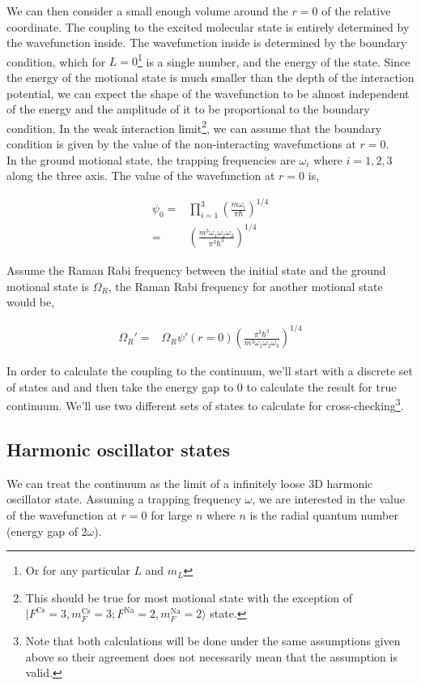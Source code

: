 \documentclass[10pt,fleqn]{article}
\newcommand{\eqar}[1]
{
  \begin{align*}
    #1
  \end{align*}
}
\newcommand{\paren}[1]{{\left({#1}\right)}}
\begin{document}
We can then consider a small enough volume around the $r=0$ of the relative coordinate.
The coupling to the excited molecular state is entirely determined by the wavefunction
inside. The wavefunction inside is determined by the boundary condition,
which for $L=0$\footnote{Or for any particular $L$ and $m_L$} is a single number,
and the energy of the state. Since the energy of the motional state is much smaller than
the depth of the interaction potential, we can expect the shape of the wavefunction
to be almost independent of the energy and the amplitude of it to be proportional to
the boundary condition. In the weak interaction limit\footnote{This should be true for most
  motional state with the exception of $|F^{\mathrm{Cs}}\!=\!3, m_{F}^{\mathrm{Cs}}\!=\!3; F^{\mathrm{Na}}\!=\!2, m_{F}^{\mathrm{Na}}\!=\!2\rangle$ state.},
we can assume that the boundary condition is given by the value of
the non-interacting wavefunctions at $r=0$.\\

In the ground motional state, the trapping frequencies are $\omega_i$ where $i=1,2,3$
along the three axis. The value of the wavefunction at $r=0$ is,

\eqar{
  \psi_0=&\prod_{i=1}^{3}\paren{\frac{m\omega_i}{\pi\hbar}}^{1/4}\\
  =&\paren{\frac{m^3\omega_1\omega_2\omega_3}{\pi^3\hbar^3}}^{1/4}
}

Assume the Raman Rabi frequency between the initial state and the ground motional state
is $\Omega_R$, the Raman Rabi frequency for another motional state would be,

\eqar{
  \Omega_R'=&\Omega_R\psi'(r=0)\paren{\frac{\pi^3\hbar^3}{m^3\omega_1\omega_2\omega_3}}^{1/4}
}

In order to calculate the coupling to the continuum, we'll start with a discrete set of states
and and then take the energy gap to $0$ to calculate the result for true continuum.
We'll use two different sets of states to calculate for cross-checking\footnote{
  Note that both calculations will be done under the same assumptions given above so their
  agreement does not necessarily mean that the assumption is valid.}.

\subsection{Harmonic oscillator states}

We can treat the continuum as the limit of a infinitely loose 3D harmonic oscillator state.
Assuming a trapping frequency $\omega$, we are interested in the value of the wavefunction
at $r=0$ for large $n$ where $n$ is the radial quantum number (energy gap of $2\omega$).
\end{document}
